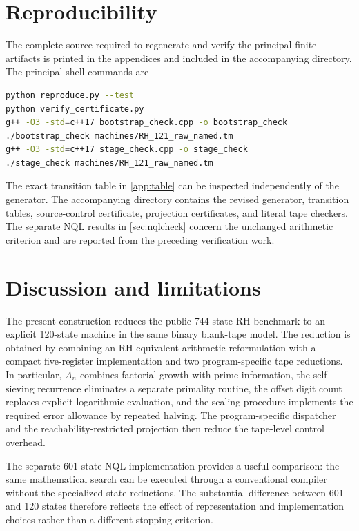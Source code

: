 \documentclass[10pt]{article}
\theoremstyle{definition}
\begin{document}
\section{Reproducibility}

The complete source required to regenerate and verify the principal finite
artifacts is printed in the appendices and included in the accompanying
directory. The principal shell commands are
\begin{lstlisting}[language=bash]
python reproduce.py --test
python verify_certificate.py
g++ -O3 -std=c++17 bootstrap_check.cpp -o bootstrap_check
./bootstrap_check machines/RH_121_raw_named.tm
g++ -O3 -std=c++17 stage_check.cpp -o stage_check
./stage_check machines/RH_121_raw_named.tm
\end{lstlisting}
The exact transition table in \cref{app:table} can be inspected independently
of the generator. The accompanying directory contains the revised generator, transition tables,
source-control certificate, projection certificates, and literal tape checkers.
The separate NQL results in \cref{sec:nqlcheck} concern the unchanged arithmetic
criterion and are reported from the preceding verification work.

\section{Discussion and limitations}

The present construction reduces the public 744-state RH benchmark to an
explicit 120-state machine in the same binary blank-tape model. The reduction
is obtained by combining an RH-equivalent arithmetic reformulation with a
compact five-register implementation and two program-specific tape reductions.
In particular, $A_n$ combines factorial growth with prime information, the
self-sieving recurrence eliminates a separate primality routine, the offset
digit count replaces explicit logarithmic evaluation, and the scaling
procedure implements the required error allowance by repeated halving. The
program-specific dispatcher and the reachability-restricted projection then
reduce the tape-level control overhead.

The separate 601-state NQL implementation provides a useful comparison: the
same mathematical search can be executed through a conventional compiler
without the specialized state reductions. The substantial difference between
601 and 120 states therefore reflects the effect of representation and
implementation choices rather than a different stopping criterion.
\end{document}
